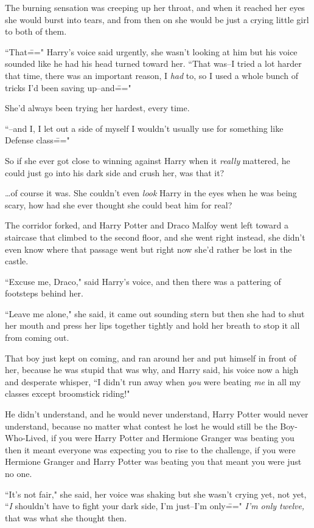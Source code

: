 The burning sensation was creeping up her throat, and when it reached her eyes she would burst into tears, and from then on she would be just a crying little girl to both of them.

``That\===" Harry's voice said urgently, she wasn't looking at him but his voice sounded like he had his head turned toward her. ``That was\---I tried a lot harder that time, there was an important reason, I \emph{had} to, so I used a whole bunch of tricks I'd been saving up\---and\==="

She'd always been trying her hardest, every time.

``\---and I, I let out a side of myself I wouldn't usually use for something like Defense class\==="

So if she ever got close to winning against Harry when it \emph{really} mattered, he could just go into his dark side and crush her, was that it?

{\ldots}of course it was. She couldn't even \emph{look} Harry in the eyes when he was being scary, how had she ever thought she could beat him for real?

The corridor forked, and Harry Potter and Draco Malfoy went left toward a staircase that climbed to the second floor, and she went right instead, she didn't even know where that passage went but right now she'd rather be lost in the castle.

``Excuse me, Draco," said Harry's voice, and then there was a pattering of footsteps behind her.

``Leave me alone," she said, it came out sounding stern but then she had to shut her mouth and press her lips together tightly and hold her breath to stop it all from coming out.

That boy just kept on coming, and ran around her and put himself in front of her, because he was stupid that was why, and Harry said, his voice now a high and desperate whisper, ``I didn't run away when \emph{you} were beating \emph{me} in all my classes except broomstick riding!"

He didn't understand, and he would never understand, Harry Potter would never understand, because no matter what contest he lost he would still be the Boy-Who-Lived, if you were Harry Potter and Hermione Granger was beating you then it meant everyone was expecting you to rise to the challenge, if you were Hermione Granger and Harry Potter was beating you that meant you were just no one.

``It's not fair," she said, her voice was shaking but she wasn't crying yet, not yet, ``\emph{I} shouldn't have to fight your dark side, I'm just\---I'm only\===" \emph{I'm only twelve,} that was what she thought then.


